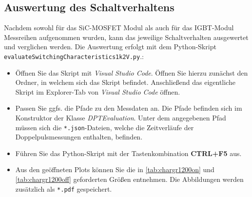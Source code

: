 \subsection{Auswertung des Schaltverhaltens} \label{sec:matlab1200}

Nachdem sowohl für das \gls{SiC}-\gls{MOSFET} Modul als auch für das \gls{IGBT}-Modul Messreihen aufgenommen wurden, 
kann das jeweilige Schaltverhalten ausgewertet und verglichen werden. Die Auswertung erfolgt mit dem
Python-Skript \\ \verb|evaluateSwitchingCharacteristics1k2V.py|.:

\begin{itemize}
	\item Öffnen Sie das Skript mit \textit{Visual Studio Code}. Öffnen Sie hierzu zunächst den Ordner,
	in welchem sich das Skript befindet. Anschließend das eigentliche Skript im Explorer-Tab von \textit{Visual Studio Code} öffnen.
	\item Passen Sie ggfs. die Pfade zu den Messdaten an. Die Pfade befinden sich im Konstruktor der Klasse \textit{DPTEvaluation}. 
	Unter dem angegebenen Pfad müssen sich die \verb|*.json|-Dateien, welche die Zeitverläufe der Doppelpulsmessungen enthalten, befinden.
	\item Führen Sie das Python-Skript mit der Tastenkombination \textbf{CTRL+F5} aus.
	\item Aus den geöffneten Plots können Sie die in \ref{tab:chargr1200on} und \ref{tab:chargr1200off} geforderten 
	Größen entnehmen. Die Abbildungen werden zusätzlich als \verb|*.pdf| gespeichert.
\end{itemize}
